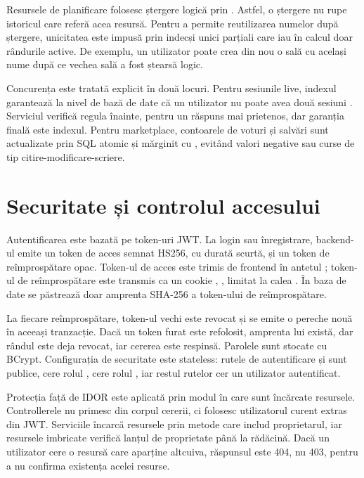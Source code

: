 Resursele de planificare folosesc ștergere logică prin . Astfel, o ștergere nu rupe
istoricul care referă acea resursă. Pentru a permite reutilizarea numelor după ștergere, unicitatea
este impusă prin indecși unici parțiali care iau în calcul doar rândurile active. De exemplu, un
utilizator poate crea din nou o sală cu același nume după ce vechea sală a fost ștearsă logic.

Concurența este tratată explicit în două locuri. Pentru sesiunile live, indexul
 garantează la nivel de bază de date că un utilizator nu
poate avea două sesiuni . Serviciul verifică regula înainte, pentru un răspuns mai
prietenos, dar garanția finală este indexul. Pentru marketplace, contoarele de voturi și salvări sunt
actualizate prin SQL atomic și mărginit cu , evitând valori negative sau curse
de tip citire-modificare-scriere.

\section{Securitate și controlul accesului}
\label{sec:securitate}

Autentificarea este bazată pe token-uri JWT. La login sau înregistrare, backend-ul emite un token de
acces semnat HS256, cu durată scurtă, și un token de reîmprospătare opac. Token-ul de acces este
trimis de frontend în antetul ; token-ul de reîmprospătare este transmis ca un
cookie , , limitat la calea . În baza de date se
păstrează doar amprenta SHA-256 a token-ului de reîmprospătare.

La fiecare reîmprospătare, token-ul vechi este revocat și se emite o pereche nouă în aceeași
tranzacție. Dacă un token furat este refolosit, amprenta lui există, dar rândul este deja revocat, iar
cererea este respinsă. Parolele sunt stocate cu BCrypt. Configurația de securitate este stateless:
rutele de autentificare și  sunt publice,  cere rolul
,  cere rolul , iar restul rutelor  cer un
utilizator autentificat.

Protecția față de IDOR este aplicată prin modul în care sunt încărcate resursele. Controllerele nu
primesc  din corpul cererii, ci folosesc utilizatorul curent extras din JWT. Serviciile
încarcă resursele prin metode care includ proprietarul, iar resursele imbricate verifică lanțul de
proprietate până la rădăcină. Dacă un utilizator cere o resursă care aparține altcuiva, răspunsul este
404, nu 403, pentru a nu confirma existența acelei resurse.

